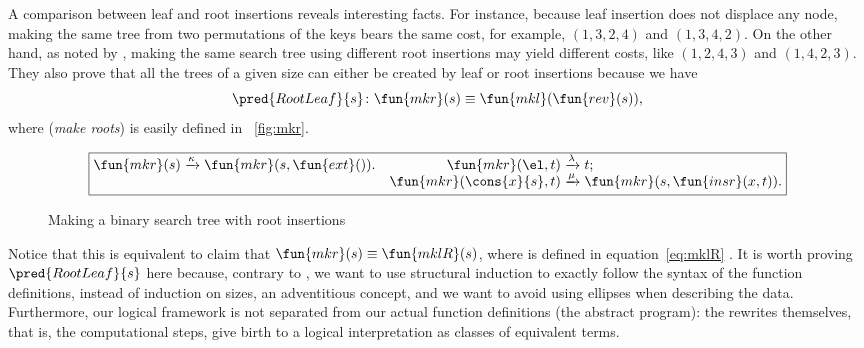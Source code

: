 
A comparison between leaf and root insertions reveals interesting
facts. For instance, because leaf insertion does not displace any
node, making the same tree from two permutations of the keys bears the
same cost, for example, \((1,3,2,4)\) and \((1,3,4,2)\). On the other
hand, as noted by \cite{GeldenhuysVanderMerwe_2009}, making the same
search tree using different root insertions may yield different costs,
like \((1,2,4,3)\) and \((1,4,2,3)\). They also prove that all the
trees of a given size can either be created by leaf or root insertions
because we have
\begin{equation}
\pred{RootLeaf}{s} \colon \fun{mkr}(s) \equiv \fun{mkl}(\fun{rev}(s)),
\label{thm:RootLeaf}
\index{RootLeaf@\predName{RootLeaf}}
\end{equation}
where  
(\emph{make roots}) is easily defined in \fig~\vref{fig:mkr}.
\begin{figure}
\begin{equation*}
\boxed{
\begin{array}{@{}r@{\;}l@{\;}lr@{\;}l@{\;}l@{}}
\fun{mkr}(s) & \xrightarrow{\smash{\kappa}} &
\fun{mkr}(s,\fun{ext}()).
& \fun{mkr}(\el,t) & \xrightarrow{\smash{\lambda}} & t;\\
&&&\fun{mkr}(\cons{x}{s},t) & \xrightarrow{\smash{\mu}} & \fun{mkr}(s,\fun{insr}(x,t)).
\end{array}}
\end{equation*}
\caption{Making a binary search tree with root insertions}
\label{fig:mkr}
\end{figure}
Notice that this is equivalent to claim that \(\fun{mkr}(s) \equiv
\fun{mklR}(s)\), where  is defined in
equation~\eqref{eq:mklR} . It is worth proving
\(\pred{RootLeaf}{s}\) here because, contrary to
\cite{GeldenhuysVanderMerwe_2009}, we want to use structural induction
to exactly follow the syntax of the function definitions, instead of
induction on sizes, an adventitious concept, and we want to avoid
using ellipses when describing the data. Furthermore, our logical
framework is not separated from our actual function definitions (the
abstract program): the rewrites themselves, that is, the computational
steps, give birth to a logical interpretation as classes of equivalent
terms.

